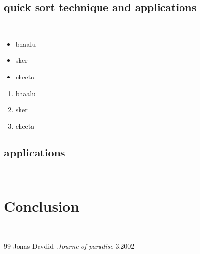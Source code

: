 \documentclass[12pt,a4paper]{report}
\begin{document}
\section{quick sort technique and applications}
\lipsum[1]\\
\begin{itemize}
\item bhaalu
\item sher
\item cheeta
\end{itemize}
\begin{enumerate}
\item bhaalu
\item sher
\item cheeta
\end{enumerate}
\section{applications}
\lipsum[1]\\
\chapter{Conclusion}
\lipsum[1]\\
\begin{thebibliography}{99}
 Jonas Davdid .\textit{Journe of paradise} 3,2002
\end{thebibliography}
\end{document}
